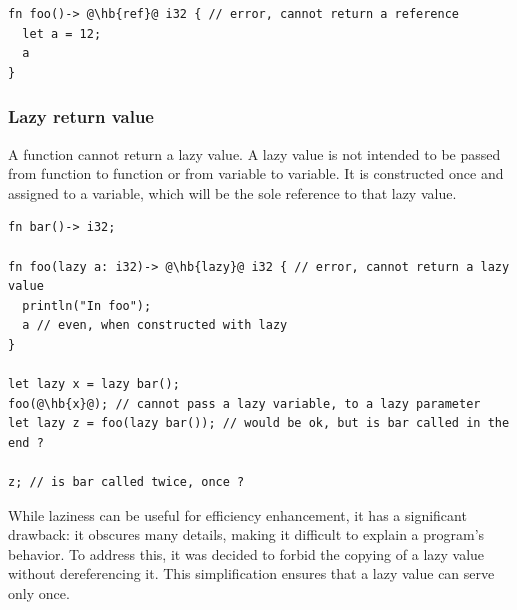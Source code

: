 \begin{lstlisting}[style=coloredverbatimError, escapechar=@]
fn foo()-> @\hb{ref}@ i32 { // error, cannot return a reference
  let a = 12;
  a
}
\end{lstlisting}

\subsubsection*{Lazy return value}
\label{sec:memory:lazy_return}

A function cannot return a lazy value. A lazy value is not intended to be passed
from function to function or from variable to variable. It is constructed once
and assigned to a variable, which will be the sole reference to that lazy value.

\begin{lstlisting}[style=coloredverbatim, escapechar=@
]fn bar()-> i32;

fn foo(lazy a: i32)-> @\hb{lazy}@ i32 { // error, cannot return a lazy value
  println("In foo");
  a // even, when constructed with lazy
}

let lazy x = lazy bar();
foo(@\hb{x}@); // cannot pass a lazy variable, to a lazy parameter
let lazy z = foo(lazy bar()); // would be ok, but is bar called in the end ?

z; // is bar called twice, once ?
\end{lstlisting}

While laziness can be useful for efficiency enhancement, it has a significant
drawback: it obscures many details, making it difficult to explain a program's
behavior. To address this, it was decided to forbid the copying of a lazy value
without dereferencing it. This simplification ensures that a lazy value can
serve only once.
